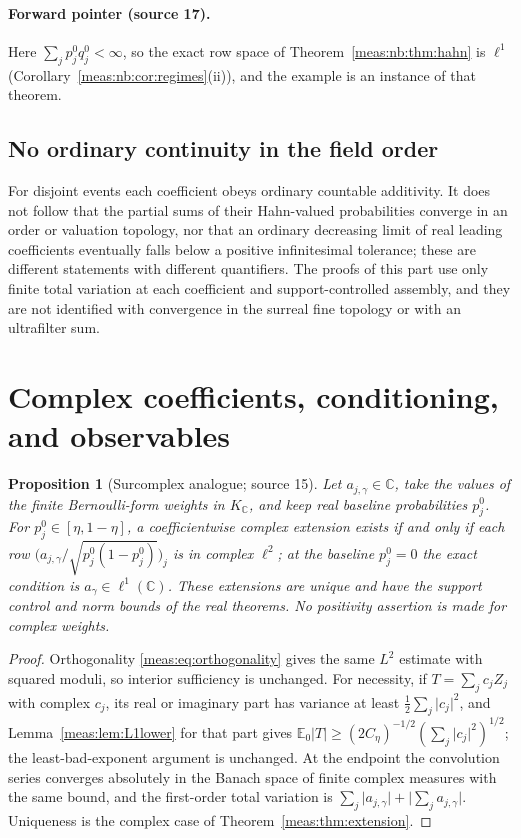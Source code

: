 \documentclass[11pt]{article}
\numberwithin{equation}{section}
\newtheorem{proposition}[theorem]{Proposition}
\theoremstyle{definition}
\theoremstyle{remark}
\newcommand{\C}{\mathbb C}
\newcommand{\KC}{K_{\C}}
\newcommand{\E}{\mathbb E}
\newcommand{\abs}[1]{\lvert#1\rvert}
\begin{document}
\paragraph{Forward pointer (source 17).} Here $\sum_jp_j^0q_j^0<\infty$, so the exact
row space of Theorem~\ref{meas:nb:thm:hahn} is $\ell^1$
(Corollary~\ref{meas:nb:cor:regimes}(ii)), and the example is an instance of that
theorem.

\subsection{No ordinary continuity in the field order}

For disjoint events each coefficient obeys ordinary countable additivity. It does
not follow that the partial sums of their Hahn-valued probabilities converge in
an order or valuation topology, nor that an ordinary decreasing limit of real
leading coefficients eventually falls below a positive infinitesimal tolerance;
these are different statements with different quantifiers. The proofs of this
part use only finite total variation at each coefficient and support-controlled
assembly, and they are not identified with convergence in the surreal fine
topology or with an ultrafilter sum.

\section{Complex coefficients, conditioning, and observables}
\label{meas:sec:coef-complex}

\begin{proposition}[Surcomplex analogue; source 15]\label{meas:prop:complex}
Let $a_{j,\gamma}\in\C$, take the values of the finite Bernoulli-form weights in
$\KC$, and keep real baseline probabilities $p_j^0$. For $p_j^0\in[\eta,1-\eta]$, a
coefficientwise complex extension exists if and only if each row
$\bigl(a_{j,\gamma}/\sqrt{p_j^0(1-p_j^0)}\bigr)_j$ is in complex $\ell^2$; at the baseline
$p_j^0=0$ the exact condition is $a_\gamma\in\ell^1(\C)$. These extensions are unique
and have the support control and norm bounds of the real theorems. No positivity
assertion is made for complex weights.
\end{proposition}
\begin{proof}
Orthogonality \eqref{meas:eq:orthogonality} gives the same $L^2$ estimate with
squared moduli, so interior sufficiency is unchanged. For necessity, if
$T=\sum_jc_jZ_j$ with complex $c_j$, its real or imaginary part has variance at
least $\frac12\sum_j\abs{c_j}^2$, and Lemma~\ref{meas:lem:L1lower} for that part gives
$\E_0\abs T\ge(2C_\eta)^{-1/2}(\sum_j\abs{c_j}^2)^{1/2}$; the least-bad-exponent
argument is unchanged. At the endpoint the convolution series converges
absolutely in the Banach space of finite complex measures with the same bound,
and the first-order total variation is $\sum_j\abs{a_{j,\gamma}}+\abs{\sum_ja_{j,\gamma}}$.
Uniqueness is the complex case of Theorem~\ref{meas:thm:extension}.
\end{proof}
\end{document}
